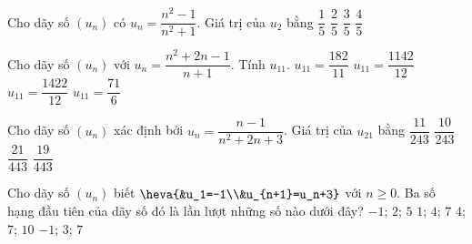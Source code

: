 \begin{ex}%
	Cho dãy số $(u_n)$ có $u_n=\dfrac{n^2-1}{n^2+1}$.  Giá trị của $u_2$ bằng
	\choice 
		{$\dfrac{1}{5}$} 
		{$\dfrac{2}{5}$} 
		{\True  $\dfrac{3}{5}$}
		 {$\dfrac{4}{5}$}
\end{ex}

\begin{ex}%
	Cho dãy số $(u_n)$ với $u_n=\dfrac{n^2+2n-1}{n+1}$. Tính $u_{11}$. 
	\choice 
		 {$u_{11}=\dfrac{182}{11}$}
		{$u_{11}=\dfrac{1142}{12}$} 
		 {$u_{11}=\dfrac{1422}{12}$}
		 {\True$u_{11}=\dfrac{71}{6}$}
\end{ex}

\begin{ex}%
	Cho dãy số $(u_n)$ xác định bởi $u_n=\dfrac{n-1}{n^2+2n+3}$. Giá  trị của $u_{21}$ bằng
	 \choice
		 {$\dfrac{11}{243}$}
		{\True $\dfrac{10}{243}$} 
		{$\dfrac{21}{443}$} 
		{$\dfrac{19}{443}$} 
\end{ex}

\begin{ex}%
	Cho  dãy số $(u_n)$ biết $ \heva{&u_1=-1\\&u_{n+1}=u_n+3}$ với $n \ge 0$. Ba số hạng đầu tiên của dãy số đó là lần lượt những số nào dưới đây?
	 \choice
		{\True $-1$; $2$; $5$} 
		 {$1$; $4$; $7$}
		{$4$;  $7$; $10$}
		{$-1$; $3$;  $7$}
\end{ex}

